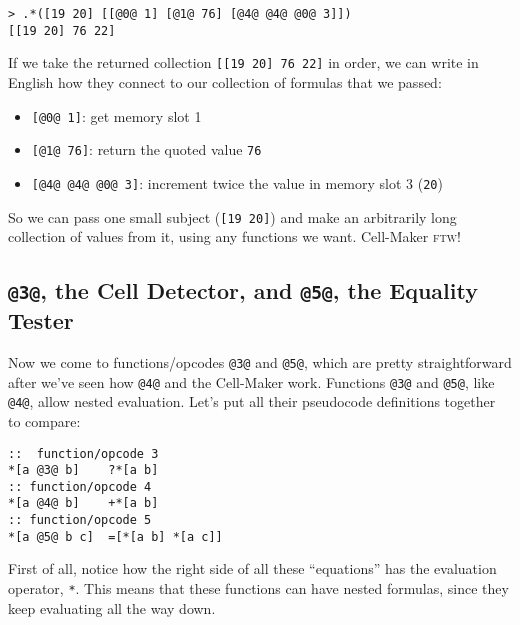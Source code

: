 \documentclass[twoside]{article}
\begin{document}
\begin{lstlisting}[style=listingblock]
> .*([19 20] [[@0@ 1] [@1@ 76] [@4@ @4@ @0@ 3]])
[[19 20] 76 22]
\end{lstlisting}

If we take the returned collection \lstinline[style=inlinecode]{[[19 20] 76 22]} in order, we can write in English how they connect to our collection of formulas that we passed:

\begin{itemize}
  \item  \lstinline[style=inlinecode]{[@0@ 1]}: get memory slot 1
  \item  \lstinline[style=inlinecode]{[@1@ 76]}: return the quoted value \lstinline[style=inlinecode]{76}
  \item  \lstinline[style=inlinecode]{[@4@ @4@ @0@ 3]}: increment twice the value in memory slot 3 (\lstinline[style=inlinecode]{20})
\end{itemize}

So we can pass one small subject (\lstinline[style=inlinecode]{[19 20]}) and make an arbitrarily long collection of values from it, using any functions we want. Cell-Maker \textsc{ftw}!

\subsection{\lstinline[style=inlinecode]{@3@}, the Cell Detector, and \lstinline[style=inlinecode]{@5@}, the Equality Tester}

Now we come to functions/opcodes \lstinline[style=inlinecode]{@3@} and \lstinline[style=inlinecode]{@5@}, which are pretty straightforward after we've seen how \lstinline[style=inlinecode]{@4@} and the Cell-Maker work. Functions \lstinline[style=inlinecode]{@3@} and \lstinline[style=inlinecode]{@5@}, like \lstinline[style=inlinecode]{@4@}, allow nested evaluation. Let's put all their pseudocode definitions together to compare:

\begin{lstlisting}[style=listingcode]
::  function/opcode 3
*[a @3@ b]    ?*[a b]
:: function/opcode 4
*[a @4@ b]    +*[a b]
:: function/opcode 5
*[a @5@ b c]  =[*[a b] *[a c]]
\end{lstlisting}

First of all, notice how the right side of all these “equations” has the evaluation operator, \lstinline[style=inlinecode]{*}. This means that these functions can have nested formulas, since they keep evaluating all the way down.
\end{document}
